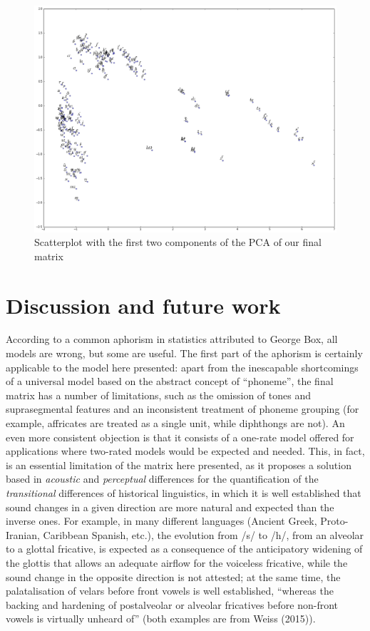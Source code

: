 \documentclass[a4paper]{article}
\begin{document}
\begin{figure}[htbp]
\centering
\includegraphics[width=1.0\textwidth]{2d_scatter.png}
\caption{Scatterplot with the first two components of the PCA
of our final matrix}
\end{figure}

\section{Discussion and future work}\label{discussion-and-future-work}

According to a common aphorism in statistics attributed to George Box,
all models are wrong, but some are useful. The first part of the
aphorism is certainly applicable to the model here presented: apart from
the inescapable shortcomings of a universal model based on the abstract
concept of ``phoneme'', the final matrix has a number of limitations,
such as the omission of tones and suprasegmental features and an
inconsistent treatment of phoneme grouping (for example, affricates are
treated as a single unit, while diphthongs are not). An even more
consistent objection is that it consists of a one-rate model offered for
applications where two-rated models would be expected and needed. This,
in fact, is an essential limitation of the matrix here presented, as it
proposes a solution based in \emph{acoustic} and \emph{perceptual}
differences for the quantification of the \emph{transitional}
differences of historical linguistics, in which it is well established
that sound changes in a given direction are more natural and expected
than the inverse ones. For example, in many different languages (Ancient
Greek, Proto-Iranian, Caribbean Spanish, etc.), the evolution from /s/
to /h/, from an alveolar to a glottal fricative, is expected as a
consequence of the anticipatory widening of the glottis that allows an
adequate airflow for the voiceless fricative, while the sound change in
the opposite direction is not attested; at the same time, the
palatalisation of velars before front vowels is well established,
``whereas the backing and hardening of postalveolar or alveolar
fricatives before non-front vowels is virtually unheard of'' (both
examples are from Weiss (2015)).
\end{document}
